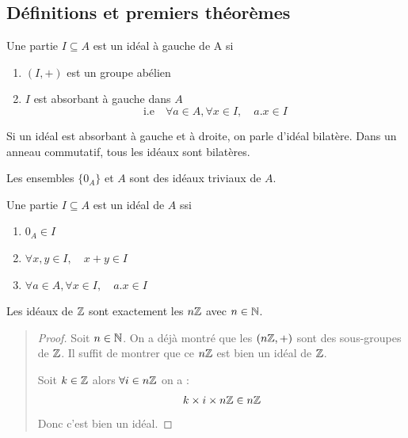 \subsection{Définitions et premiers théorèmes}

\begin{definition}[Idéal]
    Une partie $I \subseteq A$ est un idéal à gauche de A si 
    \begin{enumerate}[label=\roman*)]
        \item $(I,+)$ est un groupe abélien 
        \item $I$ est absorbant à gauche dans $A$ 
            \[ \text{i.e} \quad \forall a \in A, \forall x \in I, \quad a.x \in I \] 
    \end{enumerate}
    Si un idéal est absorbant à gauche et à droite, on parle d'idéal bilatère. 
    Dans un anneau commutatif, tous les idéaux sont bilatères. 
\end{definition}

\begin{remark}
    Les ensembles $ \{ 0_A \}$ et $A$ sont des idéaux triviaux de $A$.  
\end{remark}

\begin{proposition}
    Une partie $I \subseteq A$ est un idéal de $A$ ssi 
    \begin{enumerate}[label=\roman*)]
        \item $0_A \in I$ 
        \item $ \forall x,y \in I, \quad x + y \in I$ 
        \item $\forall a \in A, \forall x \in I, \quad a.x \in I $ 
    \end{enumerate}
\end{proposition}

\begin{theorem}[Idéaux de $\Z$]
    Les idéaux de $\Z$ sont exactement les $n\mathbb{Z}$ avec $ n \in \mathbb{N}$. 
\end{theorem}

\begin{quote}
\begin{footnotesize}
    \begin{proof}
        Soit $n \in \mathbb{N}$. On a déjà montré que les $(n\mathbb{Z},+)$ sont des sous-groupes de $\Z$. 
        Il suffit de montrer que ce $n\mathbb{Z}$ est bien un idéal de $\Z$. 

        Soit $k \in \mathbb{Z}$ alors $ \forall i \in n\mathbb{Z}$ on a : 
            \[ k \times i \times n\mathbb{Z} \in n\mathbb{Z} \]
        Donc c'est bien un idéal. 
    \end{proof}
\end{footnotesize}
\end{quote}

